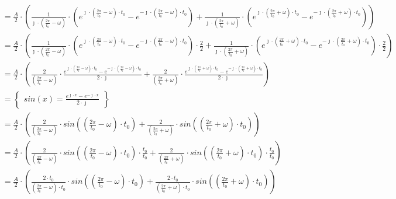 \begin{task}
\begin{align*}
&=\frac{A}{2} \cdot \left(  \frac{1}{\jmath \cdot \left(\frac{2\pi}{t_0} - \omega \right)} \cdot \left( e^{\jmath \cdot \left(\frac{2\pi}{t_0} - \omega \right) \cdot t_0 } - e^{-\jmath \cdot \left(\frac{2\pi}{t_0} - \omega \right) \cdot t_0 } \right)  + \frac{1}{\jmath \cdot \left(\frac{2\pi}{t_0} + \omega \right)} \cdot \left(e^{\jmath \cdot \left(\frac{2\pi}{t_0} + \omega \right) \cdot t_0} - e^{-\jmath \cdot \left(\frac{2\pi}{t_0} + \omega \right) \cdot t_0}\right) \right)\\
&=\frac{A}{2} \cdot \left(  \frac{1}{\jmath \cdot \left(\frac{2\pi}{t_0} - \omega \right)} \cdot \left( e^{\jmath \cdot \left(\frac{2\pi}{t_0} - \omega \right) \cdot t_0 } - e^{-\jmath \cdot \left(\frac{2\pi}{t_0} - \omega \right) \cdot t_0 } \right)\cdot \frac{2}{2}  + \frac{1}{\jmath \cdot \left(\frac{2\pi}{t_0} + \omega \right)} \cdot \left(e^{\jmath \cdot \left(\frac{2\pi}{t_0} + \omega \right) \cdot t_0} - e^{-\jmath \cdot \left(\frac{2\pi}{t_0} + \omega \right) \cdot t_0}\right) \cdot \frac{2}{2} \right)\\
&=\frac{A}{2} \cdot \left(  \frac{2}{\left(\frac{2\pi}{t_0} - \omega \right)} \cdot \frac{e^{\jmath \cdot \left(\frac{2\pi}{t_0} - \omega \right) \cdot t_0 } - e^{-\jmath \cdot \left(\frac{2\pi}{t_0} - \omega \right) \cdot t_0 } }{2 \cdot \jmath}  + \frac{2}{\left(\frac{2\pi}{t_0} + \omega \right)} \cdot \frac{e^{\jmath \cdot \left(\frac{2\pi}{t_0} + \omega \right) \cdot t_0} - e^{-\jmath \cdot \left(\frac{2\pi}{t_0} + \omega \right) \cdot t_0}}{2\cdot \jmath} \right)\\
&=\begin{Bmatrix}
sin(x) = \frac{e^{\jmath \cdot x}-e^{-\jmath \cdot x}}{2\cdot \jmath}
\end{Bmatrix}\\
&=\frac{A}{2} \cdot \left(  \frac{2}{\left(\frac{2\pi}{t_0} - \omega \right)} \cdot sin\left(\left(\frac{2\pi}{t_0} - \omega \right) \cdot t_0 \right)  + \frac{2}{\left(\frac{2\pi}{t_0} + \omega \right)} \cdot sin\left(\left(\frac{2\pi}{t_0} + \omega \right) \cdot t_0 \right) \right)\\
&=\frac{A}{2} \cdot \left(  \frac{2}{\left(\frac{2\pi}{t_0} - \omega \right)} \cdot sin\left(\left(\frac{2\pi}{t_0} - \omega \right) \cdot t_0 \right)\cdot \frac{t_0}{t_0}  + \frac{2}{\left(\frac{2\pi}{t_0} + \omega \right)} \cdot sin\left(\left(\frac{2\pi}{t_0} + \omega \right) \cdot t_0 \right) \cdot \frac{t_0}{t_0}\right)\\
&=\frac{A}{2} \cdot \left(  \frac{2\cdot t_0}{\left(\frac{2\pi}{t_0} - \omega \right)\cdot t_0} \cdot sin\left(\left(\frac{2\pi}{t_0} - \omega \right) \cdot t_0 \right)  + \frac{2 \cdot t_0}{\left(\frac{2\pi}{t_0} + \omega \right)\cdot t_0} \cdot sin\left(\left(\frac{2\pi}{t_0} + \omega \right) \cdot t_0 \right) \right)\\

\end{align*}
\end{task}
